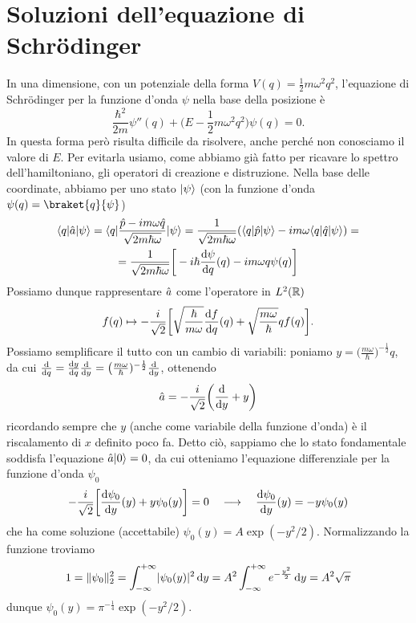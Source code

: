 \section{Soluzioni dell'equazione di Schr\"odinger}
In una dimensione, con un potenziale della forma $V(q)=\frac12m\omega^2q^2$, l'equazione di Schr\"odinger per la funzione d'onda $\psi$ nella base della posizione è
\begin{equation}
	\frac{\hbar^2}{2m}\psi''(q)+\bigg(E-\frac12m\omega^2 q^2\bigg)\psi(q)=0.
	\label{eq:schrodinger-oscillatore-1d}
\end{equation}
In questa forma però risulta difficile da risolvere, anche perch\'e non conosciamo il valore di $E$.
Per evitarla usiamo, come abbiamo già fatto per ricavare lo spettro dell'hamiltoniano, gli operatori di creazione e distruzione.
Nella base delle coordinate, abbiamo per uno stato $\ket{\psi}$ (con la funzione d'onda $\psi(q)=\braket{q}{\psi}$)
\begin{multline}
	\bra{q}\op a\ket{\psi}=\bra{q}\frac{\op p-im\omega\op q}{\sqrt{2m\hbar\omega}}\ket{\psi}=\frac1{\sqrt{2m\hbar\omega}}(\bra{q}\op p\ket{\psi}-im\omega\bra{q}\op q\ket{\psi})=\\
	=\frac1{\sqrt{2m\hbar\omega}}\bigg[-i\hbar\drv{\psi}{q}(q)-im\omega q\psi(q)\bigg]
\end{multline}
Possiamo dunque rappresentare $\op a$ come l'operatore in $\leb[2]{\R}$
\begin{equation}
	f(q)\mapsto-\frac{i}{\sqrt{2}}\bigg[\sqrt{\frac{\hbar}{m\omega}}\drv{f}{q}(q)+\sqrt{\frac{m\omega}{\hbar}}qf(q)\bigg].
\end{equation}
Possiamo semplificare il tutto con un cambio di variabili: poniamo $y=\big(\frac{m\omega}{\hbar})^{-\frac12}q$, da cui $\drv{}{q}=\drv{y}{q}\drv{}{y}=\big(\frac{m\omega}{\hbar})^{-\frac12}\drv{}{y}$, ottenendo
\begin{equation}
	\op a=-\frac{i}{\sqrt{2}}\bigg(\drv{}{y}+y\bigg)
\end{equation}
ricordando sempre che $y$ (anche come variabile della funzione d'onda) è il riscalamento di $x$ definito poco fa.
Detto ciò, sappiamo che lo stato fondamentale soddisfa l'equazione $\op a\ket{0}=0$, da cui otteniamo l'equazione differenziale per la funzione d'onda $\psi_0$
\begin{equation}
	-\frac{i}{\sqrt{2}}\bigg[\drv{\psi_0}{y}(y)+y\psi_0(y)\bigg]=0\quad\longrightarrow\quad \drv{\psi_0}{y}(y)=-y\psi_0(y)
\end{equation}
che ha come soluzione (accettabile) $\psi_0(y)=A\exp(-y^2/2)$.
Normalizzando la funzione troviamo
\begin{equation}
	1=\norm{\psi_0}_2^2=\int_{-\infty}^{+\infty}\abs{\psi_0(y)}^2\,\dd y=A^2\int_{-\infty}^{+\infty}e^{-\frac{y^2}2}\,\dd y=A^2\sqrt{\pi}
\end{equation}
dunque $\psi_0(y)=\pi^{-\frac14}\exp(-y^2/2)$.

